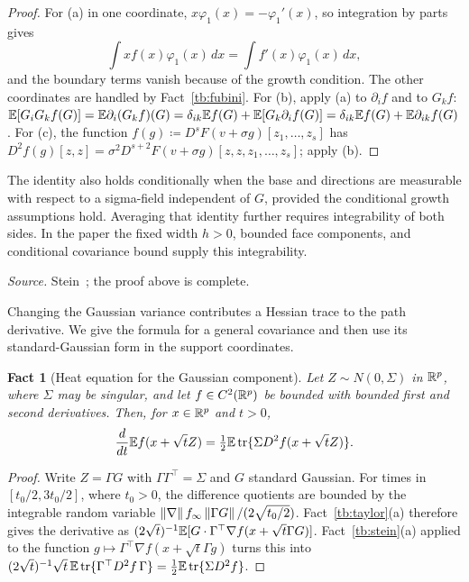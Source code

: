 \documentclass[11pt,letterpaper]{article}
\theoremstyle{plain}
\newtheorem{fact}{Fact}[section]
\begin{document}
\begin{proof}
For (a) in one coordinate, \(x\varphi_1(x)=-\varphi_1'(x)\), so integration by
parts gives
\[\int xf(x)\varphi_1(x)\,dx=\int f'(x)\varphi_1(x)\,dx,\]
and the boundary terms vanish because of the growth condition. The other coordinates
are handled by Fact~\ref{tb:fubini}. For (b), apply (a) to \(\partial_if\) and
to \(G_kf\): \(\mathbb E[G_iG_kf(G)]=\mathbb E\partial_i(G_kf)(G)=\delta_{ik}\mathbb E f(G)
+\mathbb E[G_k\partial_if(G)]=\delta_{ik}\mathbb E f(G)+\mathbb E\partial_{ik}f(G)\). For (c), the
function \(f(g)\coloneqq D^sF(v+\sigma g)[z_1,\ldots,z_s]\) has
\(D^2f(g)[z,z]=\sigma^2D^{s+2}F(v+\sigma g)[z,z,z_1,\ldots,z_s]\); apply (b).
\end{proof}

The identity also holds conditionally when the base and directions are
measurable with respect to a sigma-field independent of \(G\), provided
the conditional growth assumptions hold. Averaging that identity further
requires integrability of both sides. In the paper the fixed width
\(h>0\), bounded face components, and conditional covariance bound
supply this integrability.

\emph{Source.} Stein~; the proof above is complete.

Changing the Gaussian variance contributes a Hessian trace to the path
derivative. We give the formula for a general covariance and then use
its standard-Gaussian form in the support coordinates.

\begin{fact}[Heat equation for the Gaussian component]\label{tb:heat}
Let \(Z\sim N(0,\Sigma)\) in \(\mathbb R^p\), where \(\Sigma\) may be singular, and
let \(f\in C^2(\mathbb R^p)\) be bounded with bounded first and second derivatives.
Then, for \(x\in\mathbb R^p\) and \(t>0\),
\[
 \frac d{dt}\mathbb E f(x+\sqrt t Z)
 =\tfrac12\mathbb E\operatorname{tr}\{\Sigma D^2f(x+\sqrt t Z)\}.
\]
\end{fact}

\begin{proof}
Write \(Z=\Gamma G\) with \(\Gamma\Gamma^\top=\Sigma\) and \(G\) standard
Gaussian. For times in \([t_0/2,3t_0/2]\), where \(t_0>0\), the difference
quotients are bounded by the integrable random variable
\(\left\lVert\nabla\right\rVert f_\infty\left\lVert\Gamma G\right\rVert/(2\sqrt{t_0/2})\).
Fact~\ref{tb:taylor}(a) therefore gives the derivative as
\((2\sqrt t)^{-1}\mathbb E[G\cdot\Gamma^\top\nabla f(x+\sqrt t\Gamma G)]\).
Fact~\ref{tb:stein}(a) applied to the function \(g\mapsto
\Gamma^\top\nabla f(x+\sqrt t\Gamma g)\) turns this into
\((2\sqrt t)^{-1}\sqrt t\,\mathbb E\operatorname{tr}\{\Gamma^\top D^2f\,\Gamma\}
=\frac12\mathbb E\operatorname{tr}\{\Sigma D^2f\}\).
\end{proof}
\end{document}
